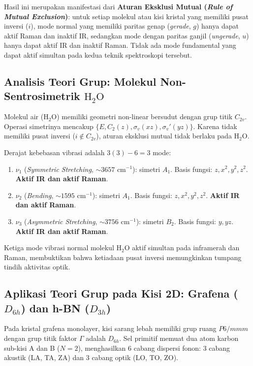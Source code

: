 Hasil ini merupakan manifestasi dari \textbf{Aturan Eksklusi Mutual (\textit{Rule of Mutual Exclusion})}: untuk setiap molekul atau kisi kristal yang memiliki pusat inversi ($i$), mode normal yang memiliki paritas genap (\textit{gerade}, $g$) hanya dapat aktif Raman dan inaktif IR, sedangkan mode dengan paritas ganjil (\textit{ungerade}, $u$) hanya dapat aktif IR dan inaktif Raman. Tidak ada mode fundamental yang dapat aktif simultan pada kedua teknik spektroskopi tersebut.

\subsection{Analisis Teori Grup: Molekul Non-Sentrosimetrik $\text{H}_2\text{O}$}
Molekul air ($\text{H}_2\text{O}$) memiliki geometri non-linear bersudut dengan grup titik $C_{2v}$. Operasi simetrinya mencakup $\{E, C_2(z), \sigma_v(xz), \sigma_v'(yz)\}$. Karena tidak memiliki pusat inversi ($i \notin C_{2v}$), aturan eksklusi mutual tidak berlaku pada $\text{H}_2\text{O}$.

Derajat kebebasan vibrasi adalah $3(3) - 6 = 3$ mode:
\begin{enumerate}
    \item $\nu_1$ (\textit{Symmetric Stretching}, $\sim 3657\text{ cm}^{-1}$): simetri $A_1$. Basis fungsi: $z, x^2, y^2, z^2$. \textbf{Aktif IR dan aktif Raman}.
    \item $\nu_2$ (\textit{Bending}, $\sim 1595\text{ cm}^{-1}$): simetri $A_1$. Basis fungsi: $z, x^2, y^2, z^2$. \textbf{Aktif IR dan aktif Raman}.
    \item $\nu_3$ (\textit{Asymmetric Stretching}, $\sim 3756\text{ cm}^{-1}$): simetri $B_2$. Basis fungsi: $y, yz$. \textbf{Aktif IR dan aktif Raman}.
\end{enumerate}
Ketiga mode vibrasi normal molekul $\text{H}_2\text{O}$ aktif simultan pada inframerah dan Raman, membuktikan bahwa ketiadaan pusat inversi memungkinkan tumpang tindih aktivitas optik.

\subsection{Aplikasi Teori Grup pada Kisi 2D: Grafena ($D_{6h}$) dan h-BN ($D_{3h}$)}
Pada kristal grafena monolayer, kisi sarang lebah memiliki grup ruang $P6/mmm$ dengan grup titik faktor $\Gamma$ adalah $D_{6h}$. Sel primitif memuat dua atom karbon sub-kisi A dan B ($N = 2$), menghasilkan 6 cabang dispersi fonon: 3 cabang akustik (LA, TA, ZA) dan 3 cabang optik (LO, TO, ZO).

